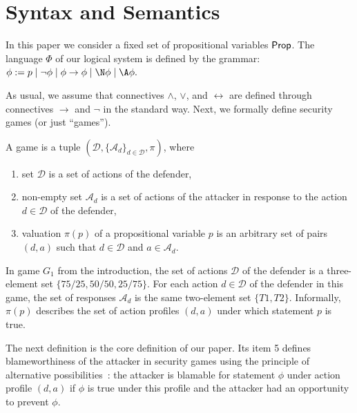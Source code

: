 \documentclass[letterpaper]{article}
\begin{document}
\section{Syntax and Semantics}\label{syntax and semantics section}

In this paper we consider a fixed set of propositional variables $\sf Prop$. 
The language $\Phi$ of our logical system is defined by the grammar:
$
\phi := p\;|\;\neg\phi\;|\;\phi\to\phi\;|\;\N\phi\;|\; \A\phi.
$

As usual, we assume that connectives $\wedge$, $\vee$, and $\leftrightarrow$ are defined through connectives $\to$ and $\neg$ in the standard way. Next, we formally define security games (or just ``games'').

\begin{definition}\label{game definition}
A game is a tuple $(\mathcal{D},\{\mathcal{A}_d\}_{d\in\mathcal{D}},\pi)$, where
\begin{enumerate}
    \item set $\mathcal{D}$ is a set of actions of the defender,
    \item non-empty set $\mathcal{A}_d$ is a set of actions of the attacker in response to the action $d\in\mathcal{D}$ of the defender,
    \item valuation $\pi(p)$ of a propositional variable $p$ is an arbitrary set of pairs $(d,a)$ such that $d\in\mathcal{D}$ and $a\in\mathcal{A}_d$.
\end{enumerate}
\end{definition} 

In game $G_1$ from the introduction, the set of actions $\mathcal{D}$ of the defender is a three-element set $\{75/25,50/50,25/75\}$. For each action $d\in\mathcal{D}$ of the defender in this game, the set of responses $\mathcal{A}_d$ is the same two-element set $\{T1,T2\}$. Informally, $\pi(p)$ describes the set of action profiles $(d,a)$ under which statement $p$ is true.

The next definition is the core definition of our paper. Its item 5 defines blameworthiness of the attacker in security games using the principle of alternative possibilities~\cite{f69tjop,w17}: the attacker is blamable for statement $\phi$ under action profile $(d,a)$ if $\phi$ is true under this profile and the attacker had an opportunity to prevent $\phi$.  
\end{document}
